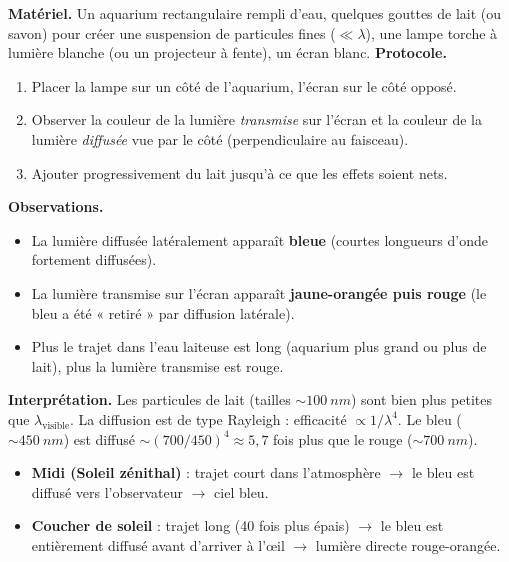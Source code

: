 \documentclass[11pt]{article}
\begin{document}
\begin{experience}
\textbf{Matériel.} Un aquarium rectangulaire rempli d'eau, quelques gouttes de lait (ou savon) pour créer une suspension de particules fines ($\ll \lambda$), une lampe torche à lumière blanche (ou un projecteur à fente), un écran blanc.
\textbf{Protocole.}
\begin{enumerate}
\item Placer la lampe sur un côté de l'aquarium, l'écran sur le côté opposé.
\item Observer la couleur de la lumière \emph{transmise} sur l'écran et la couleur de la lumière \emph{diffusée} vue par le côté (perpendiculaire au faisceau).
\item Ajouter progressivement du lait jusqu'à ce que les effets soient nets.
\end{enumerate}
\textbf{Observations.}
\begin{itemize}
\item La lumière diffusée latéralement apparaît \textbf{bleue} (courtes longueurs d'onde fortement diffusées).
\item La lumière transmise sur l'écran apparaît \textbf{jaune-orangée puis rouge} (le bleu a été « retiré » par diffusion latérale).
\item Plus le trajet dans l'eau laiteuse est long (aquarium plus grand ou plus de lait), plus la lumière transmise est rouge.
\end{itemize}
\textbf{Interprétation.} Les particules de lait (tailles $\sim \SI{100}{nm}$) sont bien plus petites que $\lambda_{\text{visible}}$. La diffusion est de type Rayleigh : efficacité $\propto 1/\lambda^4$. Le bleu ($\sim \SI{450}{nm}$) est diffusé $\sim (700/450)^4 \approx 5,7$ fois plus que le rouge ($\sim \SI{700}{nm}$).
\begin{itemize}
\item \textbf{Midi (Soleil zénithal)} : trajet court dans l'atmosphère $\to$ le bleu est diffusé vers l'observateur $\to$ ciel bleu.
\item \textbf{Coucher de soleil} : trajet long (40 fois plus épais) $\to$ le bleu est entièrement diffusé avant d'arriver à l'œil $\to$ lumière directe rouge-orangée.
\end{itemize}
\end{experience}
\end{document}
